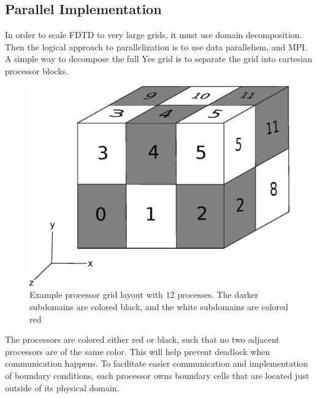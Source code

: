 \documentclass{article}
\begin{document}
\subsection{Parallel Implementation}

In order to scale FDTD to very large grids, it must use domain decomposition. Then the logical approach to parallelization is to use data parallelism, and MPI. A simple way to decompose the full Yee grid is to separate the grid into cartesian processor blocks.

\begin{figure}[h]
\centering
\includegraphics[scale=0.4]{figs/proc_grid.eps}
\caption{Example processor grid layout with 12 processes. The darker subdomains are colored black, and the white subdomains are colored red}
\end{figure}


The processors are colored either red or black, such that no two adjacent processors are of the same color. This will help prevent deadlock when communication happens. To facilitate easier communication and implementation of boundary conditions, each processor owns boundary cells that are located just outside of its physical domain.
\end{document}
